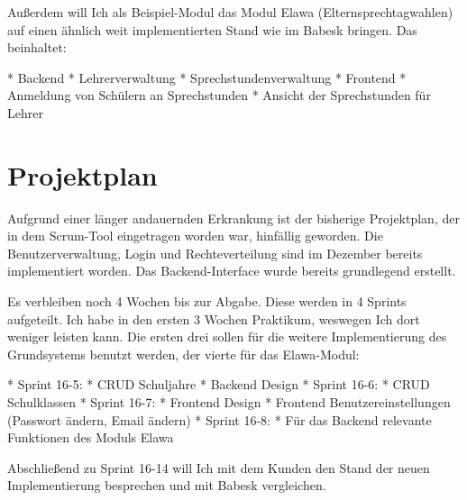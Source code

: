 \documentclass[a4paper,10pt]{scrartcl}
\begin{document}
  Außerdem will Ich als Beispiel-Modul das Modul Elawa (Elternsprechtagwahlen)
  auf einen ähnlich weit implementierten Stand wie im Babesk bringen.
  Das beinhaltet:

  * Backend
    * Lehrerverwaltung
    * Sprechstundenverwaltung
  * Frontend
    * Anmeldung von Schülern an Sprechstunden
    * Ansicht der Sprechstunden für Lehrer

\section{Projektplan}

  Aufgrund einer länger andauernden Erkrankung ist der bisherige Projektplan,
  der in dem Scrum-Tool eingetragen worden war, hinfällig geworden.
  Die Benutzerverwaltung, Login und Rechteverteilung sind im Dezember bereits
  implementiert worden.
  Das Backend-Interface wurde bereits grundlegend erstellt.

  Es verbleiben noch 4 Wochen bis zur Abgabe.
  Diese werden in 4 Sprints aufgeteilt.
  Ich habe in den ersten 3 Wochen Praktikum, weswegen Ich dort weniger leisten
  kann.
  Die ersten drei sollen für die weitere Implementierung des Grundsystems
  benutzt werden, der vierte für das Elawa-Modul:

  * Sprint 16-5:
    * CRUD Schuljahre
    * Backend Design
  * Sprint 16-6:
    * CRUD Schulklassen
  * Sprint 16-7:
    * Frontend Design
    * Frontend Benutzereinstellungen (Passwort ändern, Email ändern)
  * Sprint 16-8:
    * Für das Backend relevante Funktionen des Moduls Elawa

  Abschließend zu Sprint 16-14 will Ich mit dem Kunden den Stand der neuen
  Implementierung besprechen und mit Babesk vergleichen.
\end{document}
